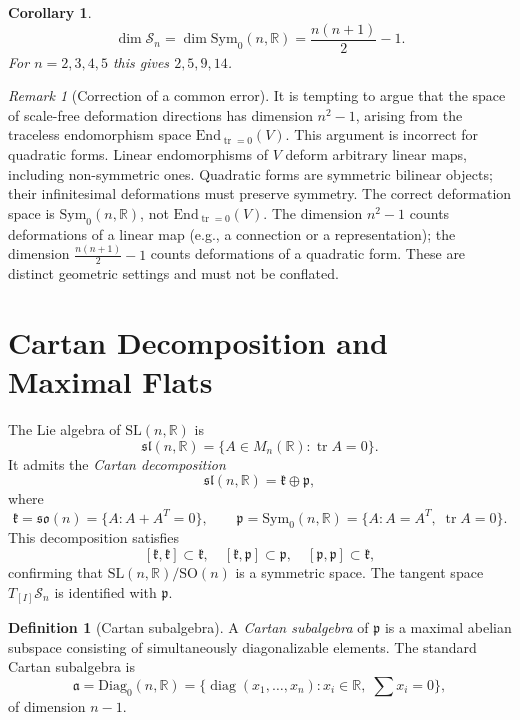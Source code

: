 \documentclass[12pt]{article}
\newtheorem{corollary}[theorem]{Corollary}
\theoremstyle{definition}
\newtheorem{definition}[theorem]{Definition}
\theoremstyle{remark}
\newtheorem{remark}[theorem]{Remark}
\newcommand{\R}{\mathbb{R}}
\newcommand{\SL}{\mathrm{SL}}
\newcommand{\SO}{\mathrm{SO}}
\newcommand{\Symz}{\mathrm{Sym}_{0}}
\newcommand{\Diagz}{\mathrm{Diag}_{0}}
\newcommand{\calM}{\mathcal{S}}
\newcommand{\tr}{\operatorname{tr}}
\newcommand{\diag}{\operatorname{diag}}
\begin{document}
\begin{corollary}
\label{cor:dim}
\[
  \dim \calM_n = \dim \Symz(n,\R) = \frac{n(n+1)}{2} - 1.
\]
For $n = 2, 3, 4, 5$ this gives $2, 5, 9, 14$.
\end{corollary}

\begin{remark}[Correction of a common error]
\label{rem:correction}
It is tempting to argue that the space of scale-free deformation
directions has dimension $n^2-1$, arising from the traceless
endomorphism space $\mathrm{End}_{\tr=0}(V)$.
This argument is incorrect for quadratic forms.
Linear endomorphisms of $V$ deform arbitrary linear maps, including
non-symmetric ones.
Quadratic forms are symmetric bilinear objects; their infinitesimal
deformations must preserve symmetry.
The correct deformation space is $\Symz(n,\R)$, not
$\mathrm{End}_{\tr=0}(V)$.
The dimension $n^2-1$ counts deformations of a linear map
(e.g., a connection or a representation); the dimension
$\frac{n(n+1)}{2}-1$ counts deformations of a quadratic form.
These are distinct geometric settings and must not be conflated.
\end{remark}

\section{Cartan Decomposition and Maximal Flats}
\label{sec:cartan}

The Lie algebra of $\SL(n,\R)$ is
\[
  \mathfrak{sl}(n,\R) = \{A \in M_n(\R) : \tr A = 0\}.
\]
It admits the \emph{Cartan decomposition}
\[
  \mathfrak{sl}(n,\R) = \mathfrak{k} \oplus \mathfrak{p},
\]
where
\[
  \mathfrak{k} = \mathfrak{so}(n)
    = \{A : A + A^T = 0\},
  \qquad
  \mathfrak{p} = \Symz(n,\R)
    = \{A : A = A^T,\; \tr A = 0\}.
\]
This decomposition satisfies
\[
  [\mathfrak{k},\mathfrak{k}] \subset \mathfrak{k},\quad
  [\mathfrak{k},\mathfrak{p}] \subset \mathfrak{p},\quad
  [\mathfrak{p},\mathfrak{p}] \subset \mathfrak{k},
\]
confirming that $\SL(n,\R)/\SO(n)$ is a symmetric space.
The tangent space $T_{[I]}\calM_n$ is identified with $\mathfrak{p}$.

\begin{definition}[Cartan subalgebra]
A \emph{Cartan subalgebra} of $\mathfrak{p}$ is a maximal abelian
subspace consisting of simultaneously diagonalizable elements.
The standard Cartan subalgebra is
\[
  \mathfrak{a} = \Diagz(n,\R)
  = \{\diag(x_1,\ldots,x_n) : x_i \in \R,\; \textstyle\sum x_i = 0\},
\]
of dimension $n-1$.
\end{definition}
\end{document}
